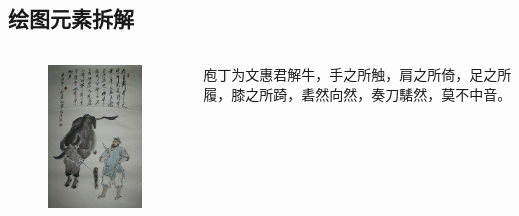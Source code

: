 \documentclass{beamerthemeMono}
\begin{document}
\subsection{绘图元素拆解}
\begin{frame}{\subsecname}{}
  \begin{columns}
    \begin{column}{.4\textwidth}
      \begin{figure}
        \centering \includegraphics[width=\columnwidth]{庖丁解牛.jpg}
      \end{figure}
    \end{column}

    \begin{column}{.6\textwidth}
      \begin{ornamentblock}
        { 庖丁为文惠君解牛，手之所触，肩之所倚，足之所履，膝之所踦，砉然向然，奏刀騞然，莫不中音。\\
          }
      \end{ornamentblock}
    \end{column}
  \end{columns}
\end{frame}
\end{document}
